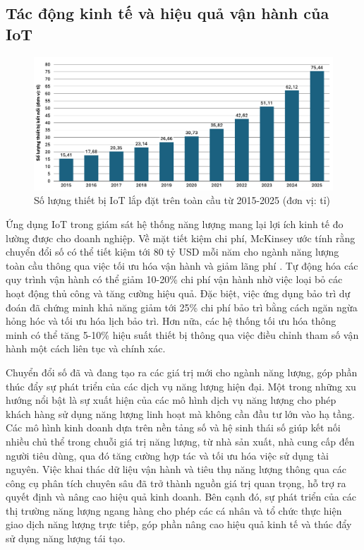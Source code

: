 \documentclass[../main.tex]{subfiles}
\begin{document}
\subsection{Tác động kinh tế và hiệu quả vận hành của IoT}
\label{sec:iot_economic_operational_impact}

\begin{figure}
    \centering
    \includegraphics[width=1\textwidth]{Hinhve/iot_device.png}
    \caption{Số lượng thiết bị IoT lắp đặt trên toàn cầu từ 2015-2025 (đơn vị: tỉ) \cite{statista2023iot}}
    \label{fig:iot_device}
\end{figure}


Ứng dụng IoT trong giám sát hệ thống năng lượng mang lại lợi ích kinh tế đo lường được cho doanh nghiệp. Về mặt tiết kiệm chi phí, McKinsey ước tính rằng chuyển đổi số có thể tiết kiệm tới 80 tỷ USD mỗi năm cho ngành năng lượng toàn cầu thông qua việc tối ưu hóa vận hành và giảm lãng phí \cite{mckinsey2023digital}. Tự động hóa các quy trình vận hành có thể giảm 10-20\% chi phí vận hành nhờ việc loại bỏ các hoạt động thủ công và tăng cường hiệu quả. Đặc biệt, việc ứng dụng bảo trì dự đoán đã chứng minh khả năng giảm tới 25\% chi phí bảo trì bằng cách ngăn ngừa hỏng hóc và tối ưu hóa lịch bảo trì. Hơn nữa, các hệ thống tối ưu hóa thông minh có thể tăng 5-10\% hiệu suất thiết bị thông qua việc điều chỉnh tham số vận hành một cách liên tục và chính xác.

Chuyển đổi số đã và đang tạo ra các giá trị mới cho ngành năng lượng, góp phần thúc đẩy sự phát triển của các dịch vụ năng lượng hiện đại. Một trong những xu hướng nổi bật là sự xuất hiện của các mô hình dịch vụ năng lượng cho phép khách hàng sử dụng năng lượng linh hoạt mà không cần đầu tư lớn vào hạ tầng. Các mô hình kinh doanh dựa trên nền tảng số và hệ sinh thái số giúp kết nối nhiều chủ thể trong chuỗi giá trị năng lượng, từ nhà sản xuất, nhà cung cấp đến người tiêu dùng, qua đó tăng cường hợp tác và tối ưu hóa việc sử dụng tài nguyên. Việc khai thác dữ liệu vận hành và tiêu thụ năng lượng thông qua các công cụ phân tích chuyên sâu đã trở thành nguồn giá trị quan trọng, hỗ trợ ra quyết định và nâng cao hiệu quả kinh doanh. Bên cạnh đó, sự phát triển của các thị trường năng lượng ngang hàng cho phép các cá nhân và tổ chức thực hiện giao dịch năng lượng trực tiếp, góp phần nâng cao hiệu quả kinh tế và thúc đẩy sử dụng năng lượng tái tạo.
\end{document}
